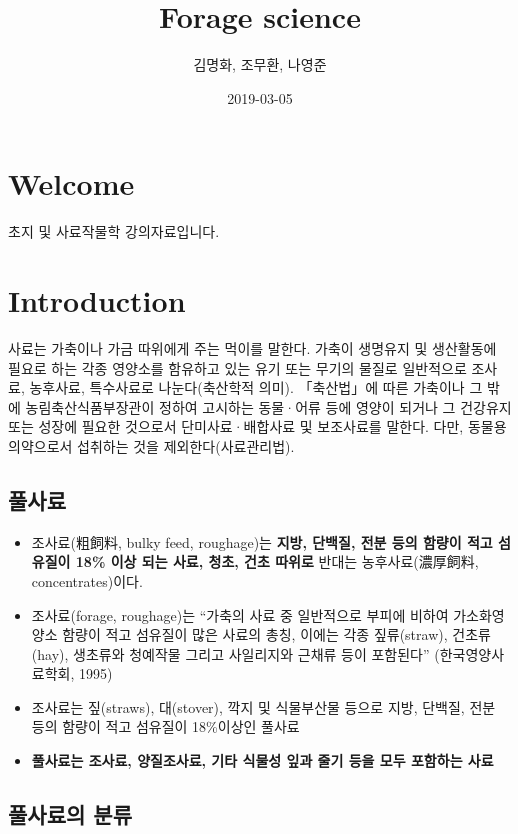 \documentclass[]{book}
\title{Forage science}
\author{김명화, 조무환, 나영준}
\date{2019-03-05}
\providecommand{\tightlist}{%
  \setlength{\itemsep}{0pt}\setlength{\parskip}{0pt}}
\begin{document}
\maketitle

{
\setcounter{tocdepth}{1}
\tableofcontents
}
\chapter*{Welcome}\label{welcome}

초지 및 사료작물학 강의자료입니다.

\chapter{Introduction}\label{intro}

사료는 가축이나 가금 따위에게 주는 먹이를 말한다. 가축이 생명유지 및
생산활동에 필요로 하는 각종 영양소를 함유하고 있는 유기 또는 무기의
물질로 일반적으로 조사료, 농후사료, 특수사료로 나눈다(축산학적 의미).
「축산법」에 따른 가축이나 그 밖에 농림축산식품부장관이 정하여 고시하는
동물·어류 등에 영양이 되거나 그 건강유지 또는 성장에 필요한 것으로서
단미사료·배합사료 및 보조사료를 말한다. 다만, 동물용의약으로서 섭취하는
것을 제외한다(사료관리법).

\section{풀사료}

\begin{itemize}
\tightlist
\item
  조사료(粗飼料, bulky feed, roughage)는 \textbf{지방, 단백질, 전분 등의
  함량이 적고 섬유질이 18\% 이상 되는 사료, 청초, 건초 따위로} 반대는
  농후사료(濃厚飼料, concentrates)이다.
\item
  조사료(forage, roughage)는 ``가축의 사료 중 일반적으로 부피에 비하여
  가소화영양소 함량이 적고 섬유질이 많은 사료의 총칭, 이에는 각종
  짚류(straw), 건초류(hay), 생초류와 청예작물 그리고 사일리지와 근채류
  등이 포함된다'' (한국영양사료학회, 1995)
\item
  조사료는 짚(straws), 대(stover), 깍지 및 식물부산물 등으로 지방,
  단백질, 전분 등의 함량이 적고 섬유질이 18\%이상인 풀사료
\item
  \textbf{풀사료는 조사료, 양질조사료, 기타 식물성 잎과 줄기 등을 모두
  포함하는 사료}
\end{itemize}

\section{풀사료의 분류}\label{-}
\end{document}
